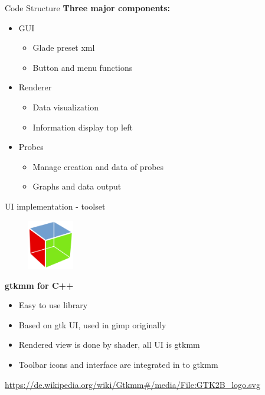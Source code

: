 \documentclass[shortpres,usenames,dvipsnames]{beamer}
\begin{document}
\begin{frame}[fragile]{Code Structure}
\textbf{Three major components:}\\
\begin{itemize}
		\item GUI
			\begin{itemize}
			\item Glade preset xml
			\item Button and menu functions
			\end{itemize}
		\item Renderer
			\begin{itemize}
			\item Data visualization
			\item Information display top left
			\end{itemize}
		\item Probes
			\begin{itemize}
			\item Manage creation and data of probes
			\item Graphs and data output
			\end{itemize}
	\end{itemize}
\end{frame}


\begin{frame}[fragile]{UI implementation - toolset}
	\begin{figure}
		\includegraphics[clip, width=20mm]{img/GTK_logo.png}
	\end{figure}
	\textbf{gtkmm for C++}
	\begin{itemize}
		\item Easy to use library 
		\item Based on gtk UI, used in gimp originally
		\item Rendered view is done by shader, all UI is gtkmm
		\item Toolbar icons and interface are integrated in to gtkmm 
	\end{itemize}
	\vfill
	\flushleft
	{\fontsize{5}{5} \selectfont \url{https://de.wikipedia.org/wiki/Gtkmm#/media/File:GTK2B_logo.svg}}
\end{frame}
	
\end{document}
